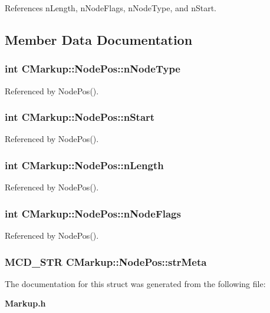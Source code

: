 References nLength, nNodeFlags, nNodeType, and nStart.

\subsection{Member Data Documentation}
\subsubsection[nNodeType]{\setlength{\rightskip}{0pt plus 5cm}int {\bf CMarkup::NodePos::nNodeType}}\label{structCMarkup_1_1NodePos_09c12f805d9906e3805a6d76d9333740}




Referenced by NodePos().
\subsubsection[nStart]{\setlength{\rightskip}{0pt plus 5cm}int {\bf CMarkup::NodePos::nStart}}\label{structCMarkup_1_1NodePos_c1939dd0ed1d2ecb35eb35bd2e88f69c}




Referenced by NodePos().
\subsubsection[nLength]{\setlength{\rightskip}{0pt plus 5cm}int {\bf CMarkup::NodePos::nLength}}\label{structCMarkup_1_1NodePos_c2001e0315fb0cd1d038612e36d4b82e}




Referenced by NodePos().
\subsubsection[nNodeFlags]{\setlength{\rightskip}{0pt plus 5cm}int {\bf CMarkup::NodePos::nNodeFlags}}\label{structCMarkup_1_1NodePos_dc46483d996c2a009779ea80bd123115}




Referenced by NodePos().
\subsubsection[strMeta]{\setlength{\rightskip}{0pt plus 5cm}MCD\_\-STR {\bf CMarkup::NodePos::strMeta}}\label{structCMarkup_1_1NodePos_b9b37d8614b6980a935157199558c261}




The documentation for this struct was generated from the following file:\begin{CompactItemize}
\item 
{\bf Markup.h}\end{CompactItemize}
